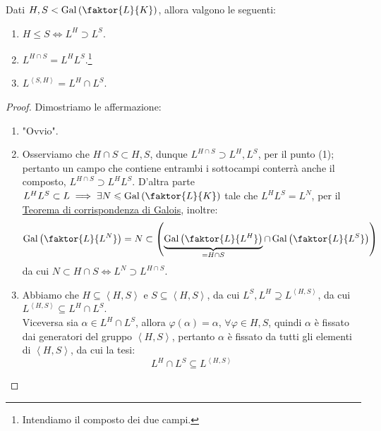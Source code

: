 \documentclass[11pt]{scrartcl}
\begin{document}
\begin{proposition}
Dati $H,S < \Gal\left(\faktor{L}{K}\right)$, allora valgono le seguenti:
\begin{enumerate}[(1)]
    \item $H \leqslant  S \iff L^H \supset L^S$.
    \item $L^{H \cap S} = L^H L^S$.\footnote{Intendiamo il composto dei due campi.} 
    \item $L^{\left<S,H\right>} = L^H \cap L^S$.
\end{enumerate}
\end{proposition}

\begin{proof}
Dimostriamo le affermazione:
\begin{enumerate}[(1)]
    \item "Ovvio".
    \item Osserviamo che $H \cap S \subset H,S$, dunque $L^{H\cap S} \supset L^H,L^S$, per il punto (1); pertanto un campo che contiene entrambi i sottocampi 
    conterrà anche il composto, $L^{H \cap S} \supset L^H L^S$. D'altra parte $L^H L^S \subset L \implies \exists N \leqslant \Gal\left(\faktor{L}{K}\right) $
    tale che $L^H L^S = L^N$, per il \hyperref[corrG]{Teorema di corrispondenza di Galois}, inoltre:
    \[ \Gal\left(\faktor{L}{L^N}\right) = N \subset \left(\underbrace{\Gal\left(\faktor{L}{L^H}\right)}_{= H \cap S} \cap \Gal\left(\faktor{L}{L^S}\right)\right)
        \]
    da cui $N \subset H \cap S \iff L^N \supset L^{H \cap S}$.
    \item Abbiamo che $H \subseteq \left<H,S\right>$ e $S \subseteq \left<H,S\right>$, da cui $L^S,L^H \supseteq L^{\left<H,S\right>}$, da cui $L^{\left<H,S\right>} \subseteq L^H \cap L^S$.\\
    Viceversa sia $\alpha \in L^H \cap L^S$, allora $\varphi(\alpha) = \alpha$, $\forall \varphi \in H,S$, quindi $\alpha$ è fissato dai generatori del gruppo $\left<H,S\right>$, pertanto $\alpha$ è fissato
    da tutti gli elementi di $\left<H,S\right>$, da cui la tesi:
    \[ L^H \cap L^S \subseteq L^{\left<H,S\right>}
        \]
\end{enumerate}
\end{proof}
\end{document}
